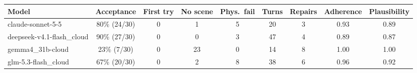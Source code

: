 \begin{tabular}{lcccccccc}
\toprule
Model & Acceptance & First try & No scene & Phys.\ fail & Turns & Repairs & Adherence & Plausibility \\
\midrule
claude-sonnet-5-5 & 80\% (24/30) & 0 & 1 & 5 & 20 & 3 & 0.93 & 0.89 \\
deepseek-v4.1-flash\_cloud & 90\% (27/30) & 0 & 0 & 3 & 47 & 4 & 0.89 & 0.87 \\
gemma4\_31b-cloud & 23\% (7/30) & 0 & 23 & 0 & 14 & 8 & 1.00 & 1.00 \\
glm-5.3-flash\_cloud & 67\% (20/30) & 0 & 2 & 8 & 38 & 6 & 0.96 & 0.92 \\
\bottomrule
\end{tabular}
